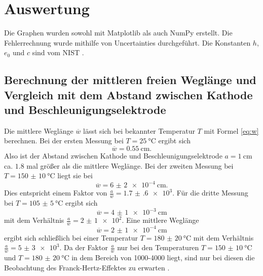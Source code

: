 \section{Auswertung}
\label{sec:Auswertung}


Die Graphen wurden sowohl mit Matplotlib \cite{matplotlib} als auch NumPy \cite{numpy} erstellt. Die
Fehlerrechnung wurde mithilfe von Uncertainties \cite{uncertainties} durchgeführt.
Die Konstanten $h$, $e_0$ und $c$ sind vom NIST \cite{nistgov}.

\subsection{Berechnung der mittleren freien Weglänge und Vergleich mit dem Abstand zwischen Kathode und Beschleunigungselektrode}
Die mittlere Weglänge $\overline{w}$ lässt sich bei bekannter Temperatur $T$ mit Formel \ref{eq:w} berechnen.
Bei der ersten Messung bei $T=\SI{25}{\degreeCelsius}$ ergibt sich
\begin{displaymath}
	\overline{w}=\SI{ 0.55}{\centi\meter}\text{.}
\end{displaymath}
Also ist der Abstand zwischen Kathode und Beschleunigungselektrode $a=\SI{1}{\centi\meter}$ ca. $1.8$ mal größer als die mittlere Weglänge.
Bei der zweiten Messung bei $T=\SI{150(10)}{\degreeCelsius}$ liegt sie bei
\begin{displaymath}
\overline{w}=\SI{6(2)e-4}{\centi\meter}\text{.}
\end{displaymath}
Dies entspricht einem Faktor von $\frac{a}{\overline{w}}=\num{1.7(6)e3}$. Für die dritte Messung bei $T=\SI{105(5)}{\degreeCelsius}$ ergibt sich
\begin{displaymath}
\overline{w}=\SI{4(1)e-3}{\centi\meter}
\end{displaymath}
mit dem Verhältnis $\frac{a}{\overline{w}}=\num{2(1)e2}$. Eine mittlere Weglänge
\begin{displaymath}
\overline{w}=\SI{2(1)e-4}{\centi\meter}
\end{displaymath}
ergibt sich schließlich bei einer Temperatur $T=\SI{180(20)}{\degreeCelsius}$ mit dem Verhältnis $\frac{a}{\overline{w}}=\num{5(3)e3}$. Da der Faktor $\frac{a}{\overline{w}}$ nur bei den Temperaturen $T=\SI{150(10)}{\degreeCelsius}$ und $T=\SI{180(20)}{\degreeCelsius}$ in dem Bereich von 1000-4000 liegt, sind nur bei diesen die Beobachtung des Franck-Hertz-Effektes zu erwarten \cite{V601}.


